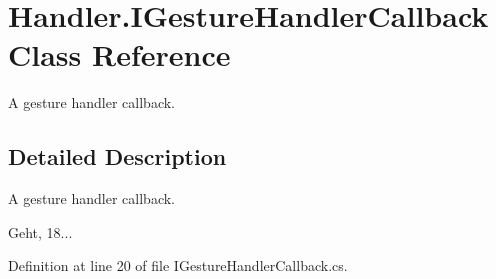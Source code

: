 \section{Handler.\-I\-Gesture\-Handler\-Callback Class Reference}
\label{class_handler_1_1_i_gesture_handler_callback}


A gesture handler callback.  




\subsection{Detailed Description}
A gesture handler callback. 

Geht, 18... 

Definition at line 20 of file I\-Gesture\-Handler\-Callback.\-cs.

